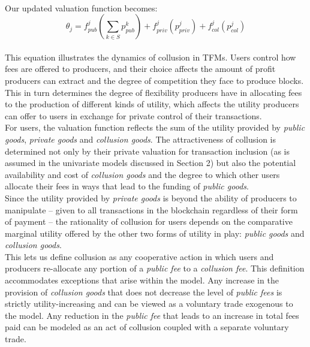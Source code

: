 \documentclass[11pt,a4paper]{llncs}
\begin{document}
\vspace{0.2cm} \\
Our updated valuation function becomes:
\vspace{0.2cm} \\
$$
\theta_j = f_{pub}^j\left(\sum_{k \in S} p_{pub}^{k}\right) + f_{priv}^j(p_{priv}^j) + f_{col}^j(p_{col}^j)
$$
\vspace{0.2cm} \\
This equation illustrates the dynamics of collusion in TFMs. Users control how fees are offered to producers, and their choice affects the amount of profit producers can extract and the degree of competition they face to produce blocks. This in turn determines the degree of flexibility producers have in allocating fees to the production of different kinds of utility, which affects the utility producers can offer to users in exchange for private control of their transactions.
\vspace{0.2cm} \\
For users, the valuation function reflects the sum of the utility provided by \textit{public goods}, \textit{private goods} and \textit{collusion goods}. The attractiveness of collusion is determined not only by their private valuation for transaction inclusion (as is assumed in the univariate models discussed in Section 2) but also the potential availability and cost of \textit{collusion goods} and the degree to which other users allocate their fees in ways that lead to the funding of \textit{public goods}.
\vspace{0.2cm} \\
Since the utility provided by \textit{private goods} is beyond the ability of producers to manipulate -- given to all transactions in the blockchain regardless of their form of payment -- the rationality of collusion for users depends on the comparative marginal utility offered by the other two forms of utility in play: \textit{public goods} and \textit{collusion goods}.
\vspace{0.2cm} \\
This lets us define collusion as any cooperative action in which users and producers re-allocate any portion of a \textit{public fee} to a \textit{collusion fee}. This definition accommodates exceptions that arise within the model. Any increase in the provision of \textit{collusion goods} that does not decrease the level of \textit{public fees} is strictly utility-increasing and can be viewed as a voluntary trade exogenous to the model. Any reduction in the \textit{public fee} that leads to an increase in total fees paid can be modeled as an act of collusion coupled with a separate voluntary trade.
\end{document}
